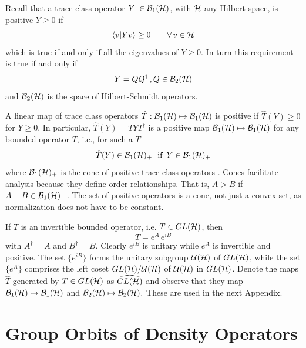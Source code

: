 \noindent Recall that a trace class operator $Y \; \in {\cal B}_{1} ( {\cal H%
})$, with ${\cal H}$ any Hilbert space, is positive $Y \ge 0$ if 
\begin{equation}
\langle v | Y v \rangle \ge 0 \qquad \forall \, v \in {\cal H}
\end{equation}
which is true if and only if all the eigenvalues of $Y \ge 0$. In turn this
requirement is true if and only if 
\begin{equation}
Y = Q Q^{\dagger} \, , Q\in {\cal B}_{2} ( {\cal H})
\end{equation}
and ${\cal B}_{2} ( {\cal H})$ is the space of Hilbert-Schmidt operators.

A linear map of trace class operators $\hat{T}:{\cal B}_{1}({\cal H})\mapsto 
{\cal B}_{1}({\cal H})$ is positive if $\hat{T}(Y)\geq 0$ for $Y\geq 0$. In
particular, $\hat{T}(Y)=TYT^{\dagger }$ is a positive map ${\cal B}_{1}(%
{\cal H})\mapsto {\cal B}_{1}({\cal H})$ for any bounded operator $T$, i.e.,
for such a $T$ 
\begin{equation}
\hat{T}(Y)\in {\cal B}_{1}({\cal H})_{+}\,\,\text{{\ if }}\,Y\in {\cal B}%
_{1}({\cal H})_{+}
\end{equation}%
where ${\cal B}_{1}({\cal H})_{+}$ is the cone of positive trace class
operators \cite{Kummer}. Cones facilitate analysis because they define order
relationships. That is, $A>B$ if $A-B\in {\cal B}_{1}({\cal H})_{+}$. The
set of positive operators is a cone, not just a convex set, as normalization
does not have to be constant.

If $T$ is an invertible bounded operator, i.e. $T\in GL({\cal H})$, then 
\begin{equation}
T=e^{A}\,e^{iB}
\end{equation}%
with $A^{\dagger }=A$ and $B^{\dagger }=B$. Clearly $e^{iB}$ is unitary
while $e^{A}$ is invertible and positive. The set $\{e^{iB}\}$ forms the
unitary subgroup ${\cal U}({\cal H})$ of $GL({\cal H})$, while the set $\{
e^{A}\}$ comprises the left coset $GL({\cal H})/{\cal U}({\cal H})$ of $%
{\cal U}({\cal H})$ in $GL({\cal H})$. Denote the maps $\hat{T}$ generated
by $T\in GL({\cal H})$ as $\widehat{GL({\cal H})}$ and observe that they map 
${\cal B}_{1}({\cal H})\mapsto {\cal B}_{1}({\cal H})$ and ${\cal B}_{2}(%
{\cal H})\mapsto {\cal B}_{2}({\cal H}).$ These are used in the next
Appendix.

\section{Group Orbits of Density Operators}

